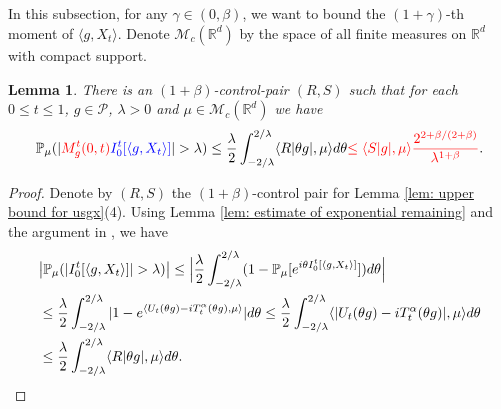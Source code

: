 \documentclass[12pt,oneside,english]{amsart}
\theoremstyle{plain}
\newtheorem{lem}[thm]{Lemma}
\theoremstyle{definition}
\numberwithin{equation}{section}
\newcommand{\added}[1]{{\color{blue}#1}}\newcommand{\deleted}[1]{{\color{red}#1}}
\begin{document}
\begin{comment}
    Therefore, for any $\mu\in \mathcal M(\mathbb R^d)$ with compact support, $k \in \mathbb{N}$, $\theta \in \mathbb{R}$ and $0\leq s\leq1$, using Jensen's inequality,
\begin{align*}
    &|\varphi_{k,\mu,s}(\theta)-1- \langle Z_{g_k}(s,\cdot, \theta),\mu\rangle|\\
    &\leq |\langle v_{g_k}(s,\cdot,\theta)-i\theta T_s^{\alpha}g_k, \mu \rangle|^2 + \langle |v_{g_k}(s,\cdot,\theta)-\tilde{v}_{g_k}(s,\cdot,\theta)|, \mu \rangle
    \\&\leq \langle |v_{g_k}(s,\cdot,\theta)-i\theta T_s^{\alpha}g_k|^2, \mu \rangle + \langle |v_{g_k}(s,\cdot,\theta)-\tilde{v}_{g_k}(s,\cdot,\theta)|, \mu \rangle
    \\&\leq e^{2\alpha}|C_g\theta e^{(\alpha-\kappa b)k+\alpha}|^{2+2\beta}\langle (\tilde R^g)^2,\mu\rangle + |C_g\theta e^{(\alpha-\kappa b)k}|^{1+2\beta}\langle R^g_1,\mu\rangle.
    \qedhere
\end{align*}
\end{proof}
\end{comment}

\subsection{}

 In this subsection, for any $\gamma \in (0,\beta)$, we want to bound the $(1+\gamma)$-th moment of $\langle g ,X_t \rangle$. Denote $\mathcal{M}_c(\mathbb{R}^d)$ by the space of all finite measures on $\mathbb{R}^d$ with compact support.
\begin{lem}
\label{lem: control pair for P(M>lambda)}
    There is an $(1+\beta)$-control-pair $(R,S)$ such that for each $0\leq t\leq 1$, $g\in \mathcal P$, $\lambda >0$ and $\mu\in \mathcal M_c(\mathbb R^d)$ we have
\[
    \mathbb P_\mu (|\deleted{M^t_g(0,t)} \added{I_0^t[\langle g,X_t\rangle]}| > \lambda)
    \leq \frac{\lambda}{2}\int_{-2/\lambda}^{2/\lambda}\langle R|\theta g|,\mu\rangle d\theta
    \deleted{\leq \langle S| g|,\mu\rangle \frac{2^{2+\beta/(2+\beta)}}{\lambda^{1+\beta}}}.
\]
\end{lem}
\added{
\begin{proof}
    Denote by $(R,S)$ the $(1+\beta)$-control pair for Lemma \ref{lem: upper bound for usgx}(4).
    Using Lemma \ref{lem: estimate of exponential remaining} and the argument in \cite[Proof of Theorem 3.3.6]{Durrett2010Probability}, we have
\begin{align}
    &\big|\mathbb P_\mu (|I_0^t[\langle g,X_t\rangle]| > \lambda)\big|
    \leq \Big|\frac{\lambda}{2}\int_{-2/\lambda}^{2/\lambda}(1 - \mathbb P_\mu[e^{i\theta I_0^t[\langle g,X_t\rangle]}])d\theta\Big|
    \\&\leq \frac{\lambda}{2}\int_{-2/\lambda}^{2/\lambda}|1-e^{\langle U_t(\theta g)-iT_t^{\alpha}(\theta g),\mu \rangle}|d\theta
    \leq \frac{\lambda}{2}\int_{-2/\lambda}^{2/\lambda}\langle |U_t(\theta g) - iT_t^\alpha(\theta g)|,\mu\rangle d\theta
    \\&\leq \frac{\lambda}{2}\int_{-2/\lambda}^{2/\lambda}\langle R|\theta g|,\mu\rangle d\theta.
      \qedhere
\end{align}
\end{proof}
}
\end{document}
